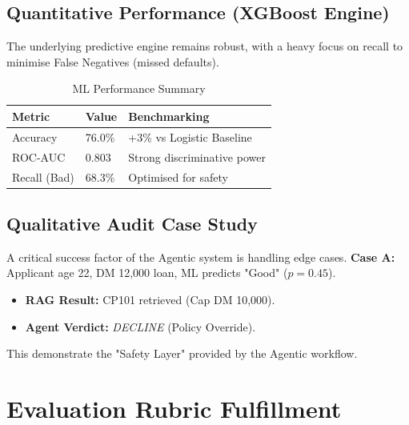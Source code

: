 \documentclass[12pt,a4paper]{article}
\begin{document}
\subsection{Quantitative Performance (XGBoost Engine)}

The underlying predictive engine remains robust, with a heavy focus on recall to
minimise False Negatives (missed defaults).

\begin{table}[H]
  \centering
  \caption{ML Performance Summary}
  \begin{tabular}{lll}
    \toprule
    \textbf{Metric} & \textbf{Value} & \textbf{Benchmarking} \\
    \midrule
    Accuracy        & 76.0\%         & +3\% vs Logistic Baseline \\
    ROC-AUC         & 0.803          & Strong discriminative power \\
    Recall (Bad)    & 68.3\%         & Optimised for safety \\
    \bottomrule
  \end{tabular}
\end{table}

\subsection{Qualitative Audit Case Study}

A critical success factor of the Agentic system is handling edge cases.
\textbf{Case A:} Applicant age 22, DM 12,000 loan, ML predicts "Good" ($p=0.45$).
\begin{itemize}
    \item \textbf{RAG Result:} CP101 retrieved (Cap DM 10,000).
    \item \textbf{Agent Verdict:} \emph{DECLINE} (Policy Override).
\end{itemize}

This demonstrate the "Safety Layer" provided by the Agentic workflow.

\newpage

\section{Evaluation Rubric Fulfillment}
\end{document}
